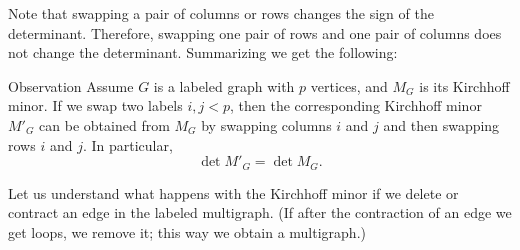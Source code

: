 Note that swapping a pair of columns or rows changes the sign of the determinant.
Therefore, swapping one pair of rows and one pair of columns does not change the determinant.
Summarizing we get the following:

\begin{thm}{Observation}\label{observaiton:swap}
Assume $G$ is a labeled graph with $p$ vertices, and $M_G$ is its Kirchhoff minor.
If we swap two labels $i,j<p$, then the corresponding Kirchhoff minor $M'_G$ can be obtained from $M_G$ by swapping columns $i$ and $j$ and then swapping rows $i$ and $j$.
In particular, 
\[\det M'_G=\det M_G.\]

\end{thm}

Let us understand what happens with the Kirchhoff minor if we delete or contract an edge in the labeled multigraph.
(If after the contraction of an edge we get loops, we remove it; this way we obtain a multigraph.)

